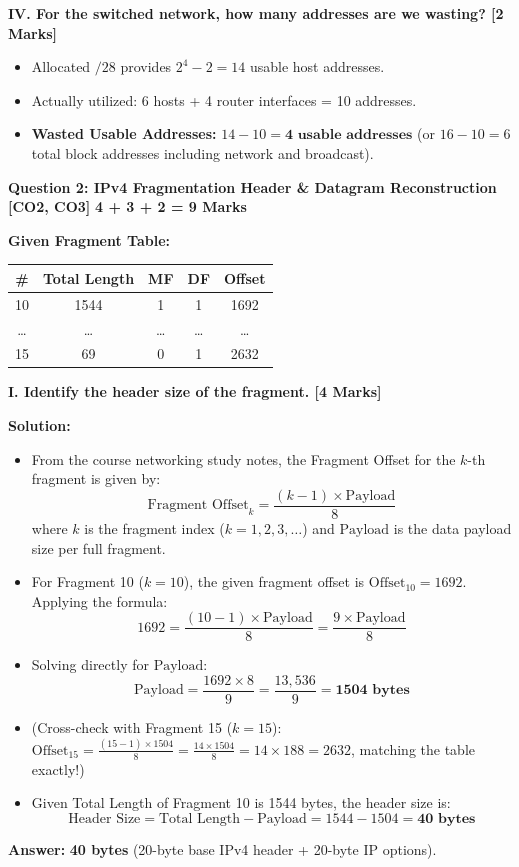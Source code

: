 \documentclass[11pt,a4paper]{article}
\newcommand{\questionheader}[3]{
    \vspace{0.35cm}
    \noindent\colorbox{qboxbg}{
        \parbox{\dimexpr\textwidth-2\fboxsep\relax}{
            \textbf{\textcolor{primary}{\large #1}} \hfill \textbf{\textcolor{accent}{[#2]}} \hfill \textbf{\textcolor{secondary}{#3 Marks}}
        }
    }
    \vspace{0.15cm}
}
\begin{document}
\vspace{0.2cm}
\textbf{IV. For the switched network, how many addresses are we wasting? [2 Marks]}
\begin{itemize}
    \item Allocated $/28$ provides $2^4 - 2 = 14$ usable host addresses.
    \item Actually utilized: 6 hosts + 4 router interfaces = 10 addresses.
    \item \textbf{Wasted Usable Addresses:} $14 - 10 = \mathbf{4\text{ usable addresses}}$ (or $16 - 10 = 6$ total block addresses including network and broadcast).
\end{itemize}

\newpage
\questionheader{Question 2: IPv4 Fragmentation Header \& Datagram Reconstruction}{CO2, CO3}{4 + 3 + 2 = 9}

\textbf{Given Fragment Table:}
\begin{center}
\begin{tabular}{|c|c|c|c|c|}
\hline
\textbf{\#} & \textbf{Total Length} & \textbf{MF} & \textbf{DF} & \textbf{Offset} \\
\hline
10 & 1544 & 1 & 1 & 1692 \\
\dots & \dots & \dots & \dots & \dots \\
15 & 69 & 0 & 1 & 2632 \\
\hline
\end{tabular}
\end{center}

\textbf{I. Identify the header size of the fragment. [4 Marks]}

\textbf{Solution:}
\begin{itemize}
    \item From the course networking study notes, the Fragment Offset for the $k$-th fragment is given by:
    \[
    \text{Fragment Offset}_k = \frac{(k - 1) \times \text{Payload}}{8}
    \]
    where $k$ is the fragment index ($k = 1, 2, 3, \dots$) and $\text{Payload}$ is the data payload size per full fragment.
    \item For Fragment 10 ($k = 10$), the given fragment offset is $\text{Offset}_{10} = 1692$. Applying the formula:
    \[
    1692 = \frac{(10 - 1) \times \text{Payload}}{8} = \frac{9 \times \text{Payload}}{8}
    \]
    \item Solving directly for $\text{Payload}$:
    \[
    \text{Payload} = \frac{1692 \times 8}{9} = \frac{13,536}{9} = \mathbf{1504\text{ bytes}}
    \]
    \item (Cross-check with Fragment 15 ($k = 15$): $\text{Offset}_{15} = \frac{(15 - 1) \times 1504}{8} = \frac{14 \times 1504}{8} = 14 \times 188 = 2632$, matching the table exactly!)
    \item Given Total Length of Fragment 10 is 1544 bytes, the header size is:
    \[
    \text{Header Size} = \text{Total Length} - \text{Payload} = 1544 - 1504 = \mathbf{40\text{ bytes}}
    \]
\end{itemize}
\textbf{Answer:} \textbf{40 bytes} (20-byte base IPv4 header + 20-byte IP options).
\end{document}
